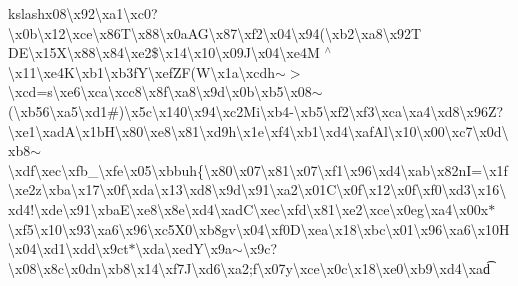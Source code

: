 \begin{DoxyCompactItemize}
kslash{}x08\textbackslash{}x92\textbackslash{}xa1\textbackslash{}xc0?\textbackslash{}x0b\textbackslash{}x12\textbackslash{}xce\textbackslash{}x86\+T\textbackslash{}x88\textbackslash{}x0a\+A\+G\textbackslash{}x87\textbackslash{}xf2\textbackslash{}x04\textbackslash{}x94(\textbackslash{}xb2\textbackslash{}xa8\textbackslash{}x92\+T D\+E\textbackslash{}x15\+X\textbackslash{}x88\textbackslash{}x84\textbackslash{}xe2\$\textbackslash{}x14\textbackslash{}x10\textbackslash{}x09\+J\textbackslash{}x04\textbackslash{}xe4\+M $^\wedge$\textbackslash{}x11\textbackslash{}xe4\+K\textbackslash{}xb1\textbackslash{}xb3f\+Y\textbackslash{}xef\+Z\+F(\+W\textbackslash{}x1a\textbackslash{}xcdh$\sim$$>$\textbackslash{}xcd=s\textbackslash{}xe6\textbackslash{}xca\textbackslash{}xcc8\textbackslash{}x8f\textbackslash{}xa8\textbackslash{}x9d\textbackslash{}x0b\textbackslash{}xb5\textbackslash{}x08$\sim$(\textbackslash{}xb56\textbackslash{}xa5\textbackslash{}xd1\#)\textbackslash{}x5c\textbackslash{}x140\textbackslash{}x94\textbackslash{}xc2\+Mi\textbackslash{}xb4-\/\textbackslash{}xb5\textbackslash{}xf2\textbackslash{}xf3\textbackslash{}xca\textbackslash{}xa4\textbackslash{}xd8\textbackslash{}x96\+Z?\textbackslash{}xe1\textbackslash{}xad\+A\textbackslash{}x1b\+H\textbackslash{}x80\textbackslash{}xe8\textbackslash{}x81\textbackslash{}xd9h\textbackslash{}x1e\textbackslash{}xf4\textbackslash{}xb1\textbackslash{}xd4\textbackslash{}xaf\+Al\textbackslash{}x10\textbackslash{}x00\textbackslash{}xc7\textbackslash{}x0d\textbackslash{}xb8$\sim$\textbackslash{}xdf\textbackslash{}xec\textbackslash{}xfb\+\_\textbackslash{}xfe\textbackslash{}x05\textbackslash{}xbbuh\{\textbackslash{}x80\textbackslash{}x07\textbackslash{}x81\textbackslash{}x07\textbackslash{}xf1\textbackslash{}x96\textbackslash{}xd4\textbackslash{}xab\textbackslash{}x82n\+I=\textbackslash{}x1f\textbackslash{}xe2z\textbackslash{}xba\textbackslash{}x17\textbackslash{}x0f\textbackslash{}xda\textbackslash{}x13\textbackslash{}xd8\textbackslash{}x9d\textbackslash{}x91\textbackslash{}xa2\textbackslash{}x01\+C\textbackslash{}x0f\textbackslash{}x12\textbackslash{}x0f\textbackslash{}xf0\textbackslash{}xd3\textbackslash{}x16\textbackslash{}xd4!\textbackslash{}xde\textbackslash{}x91\textbackslash{}xba\+E\textbackslash{}xe8\textbackslash{}x8e\textbackslash{}xd4\textbackslash{}xad\+C\textbackslash{}xec\textbackslash{}xfd\textbackslash{}x81\textbackslash{}xe2\textbackslash{}xce\textbackslash{}x0eg\textbackslash{}xa4\textbackslash{}x00x$\ast$\textbackslash{}xf5\textquotesingle{}\textbackslash{}x10\textbackslash{}x93\textbackslash{}xa6\textbackslash{}x96\textbackslash{}xc5\+X0\textbackslash{}xb8gv\textbackslash{}x04\textbackslash{}xf0\+D\textbackslash{}xea\textbackslash{}x18\textbackslash{}xbc\textbackslash{}x01\textbackslash{}x96\textbackslash{}xa6\textbackslash{}x10\+H\textbackslash{}x04\textbackslash{}xd1\textbackslash{}xdd\textbackslash{}x9ct$\ast$\textbackslash{}xda\textbackslash{}xed\+Y\textbackslash{}x9a$\sim$\textbackslash{}x9c?\textbackslash{}x08\textbackslash{}x8c\textbackslash{}x0dn\textbackslash{}xb8\textbackslash{}x14\textbackslash{}xf7\+J\textbackslash{}xd6\textbackslash{}xa2;f\textbackslash{}x07y\textbackslash{}xce\textbackslash{}x0c\textbackslash{}x18\textbackslash{}xe0\textbackslash{}xb9\textbackslash{}xd4\textbackslash{}xad\t
\end{DoxyCompactItemize}
